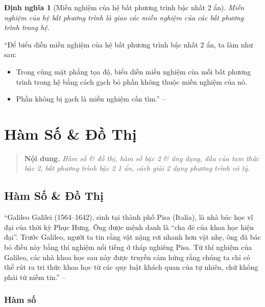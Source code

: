 \documentclass[oneside]{book}
\numberwithin{equation}{section}
\newtheorem{dinhnghia}{Định nghĩa}[section]
\begin{document}
\begin{dinhnghia}[Miền nghiệm của hệ bất phương trình bậc nhất 2 ẩn]
	\emph{Miền nghiệm} của hệ bất phương trình là giao các miền nghiệm của các bất phương trình trong hệ.
\end{dinhnghia}

\begin{tcolorbox}
	``Để biểu diễn miền nghiệm của hệ bất phương trình bậc nhất 2 ẩn, ta làm như sau:
	\begin{itemize}
		\item Trong cùng mặt phẳng tọa độ, biểu diễn miền nghiệm của mỗi bất phương trình trong hệ bằng cách gạch bỏ phần không thuộc miền nghiệm của nó.
		\item Phần không bị gạch là miền nghiệm cần tìm.'' -- \cite[p. 27]{SGK_Toan_10_Canh_Dieu_tap_1}
	\end{itemize}
\end{tcolorbox}


\chapter{Hàm Số \& Đồ Thị}

\begin{quotation}
	\textbf{Nội dung.} \textit{Hàm số \& đồ thị, hàm số bậc 2 \& ứng dụng, dấu của tam thức bậc 2, bất phương trình bậc 2 1 ẩn, cách giải 2 dạng phương trình vô tỷ}.
\end{quotation}

\section{Hàm Số \& Đồ Thị}
``Galileo Galilei (1564--1642), sinh tại thành phố Pisa (Italia), là nhà bác học vĩ đại của thời kỳ Phục Hưng. Ông được mệnh danh là ``cha đẻ của khoa học hiện đại''. Trước Galileo, người ta tin rằng vật nặng rơi nhanh hơn vật nhẹ, ông đã bác bỏ điều này bằng thí nghiệm nổi tiếng ở tháp nghiêng Pisa. Từ thí nghiệm của Galileo, các nhà khoa học sau này được truyền cảm hứng rằng chúng ta chỉ có thể rút ra tri thức khoa học từ các quy luật khách quan của tự nhiên, chứ không phải từ niềm tin.'' -- \cite[p. 31]{SGK_Toan_10_Canh_Dieu_tap_1}

\subsection{Hàm số}
\end{document}
